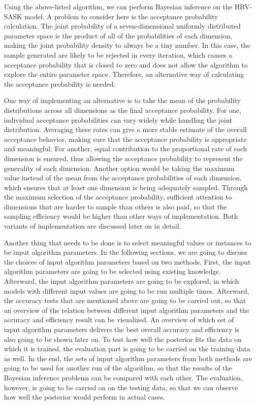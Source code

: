 Using the above-listed algorithm, we can perform Bayesian inference on the HBV-SASK model. A problem to consider here is the acceptance probability calculation. The joint probability of a seven-dimensional uniformly distributed parameter space is the product of all of the probabilities of each dimension, making the joint probability density to always be a tiny number. In this case, the sample generated are likely to be rejected in every iteration, which causes a acceptance probability that is closed to zero and does not allow the algorithm to explore the entire parameter space. Therefore, an alternative way of calculating the acceptance probability is needed. 

One way of implementing an alternative is to take the mean of the probability distributions across all dimensions as the final acceptance probability. For one, individual acceptance probabilities can vary widely while handling the joint distribution. Averaging these rates can give a more stable estimate of the overall acceptance behavior, making sure that the acceptance probability is appropriate and meaningful. For another, equal contribution to the proportional rate of each dimension is ensured, thus allowing the acceptance probability to represent the generality of each dimension. Another option would be taking the maximum value instead of the mean from the acceptance probabilities of each dimension, which ensures that at least one dimension is being adequately sampled. Through the maximum selection of the acceptance probability, sufficient attention to dimensions that are harder to sample than others is also paid, so that the sampling efficiency would be higher than other ways of implementation. Both variants of implementation are discussed later on in detail.

Another thing that needs to be done is to select meaningful values or instances to be input algorithm parameters. In the following sections, we are going to discuss the choices of input algorithm parameters based on two methods. First, the input algorithm parameters are going to be selected using existing knowledge. Afterward, the input algorithm parameters are going to be explored, in which models with different input values are going to be run multiple times. Afterward, the accuracy tests that are mentioned above are going to be carried out, so that an overview of the relation between different input algorithm parameters and the accuracy and efficiency result can be visualized. An overview of which set of input algorithm parameters delivers the best overall accuracy and efficiency is also going to be shown later on. To test how well the posterior fits the data on which it is trained, the evaluation part is going to be carried on the training data as well. In the end, the sets of input algorithm parameters from both methods are going to be used for another run of the algorithm, so that the results of the Bayesian inference problems can be compared with each other. The evaluation, however, is going to be carried on on the testing data, so that we can observe how well the posterior would perform in actual cases.

